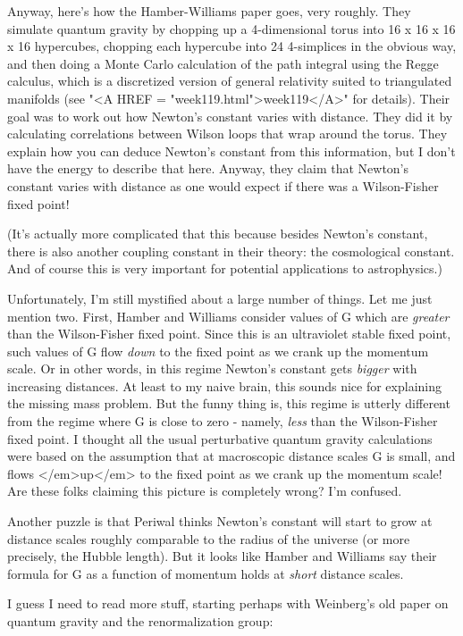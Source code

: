 Anyway, here's how the Hamber-Williams paper goes, very roughly.  
They simulate quantum gravity by chopping up a 4-dimensional torus 
into 16 x 16 x 16 x 16 hypercubes, chopping each hypercube into 24 
4-simplices in the obvious way, and then doing a Monte Carlo calculation 
of the path integral using the Regge calculus, which is a discretized 
version of general relativity suited to triangulated manifolds (see 
"<A HREF = "week119.html">week119</A>" for details).  Their goal 
was to work out how Newton's 
constant varies with distance.  They did it by calculating correlations
between Wilson loops that wrap around the torus.  They explain how
you can deduce Newton's constant from this information, but I don't
have the energy to describe that here.  Anyway, they claim that Newton's
constant varies with distance as one would expect if there was a 
Wilson-Fisher fixed point!

(It's actually more complicated that this because besides Newton's
constant, there is also another coupling constant in their theory:
the cosmological constant.  And of course this is very important
for potential applications to astrophysics.)

Unfortunately, I'm still mystified about a large number of things.  
Let me just mention two.  First, Hamber and Williams consider values
of G which are \emph{greater} than the Wilson-Fisher fixed point.  Since
this is an ultraviolet stable fixed point, such values of G flow \emph{down}
to the fixed point as we crank up the momentum scale.  Or in other 
words, in this regime Newton's constant gets \emph{bigger} with increasing
distances.  At least to my naive brain, this sounds nice for explaining
the missing mass problem.  But the funny thing is, this regime is 
utterly different from the regime where G is close to zero - namely,
\emph{less} than the Wilson-Fisher fixed point.  I thought all the usual
perturbative quantum gravity calculations were based on the assumption
that at macroscopic distance scales G is small, and flows </em>up</em> to 
the fixed point as we crank up the momentum scale!  Are these folks 
claiming this picture is completely wrong?  I'm confused.  

Another puzzle is that Periwal thinks Newton's constant will start
to grow at distance scales roughly comparable to the radius of the
universe (or more precisely, the Hubble length).  But it looks like
Hamber and Williams say their formula for G as a function of momentum
holds at \emph{short} distance scales.  

I guess I need to read more stuff, starting perhaps with Weinberg's 
old paper on quantum gravity and the renormalization group:

